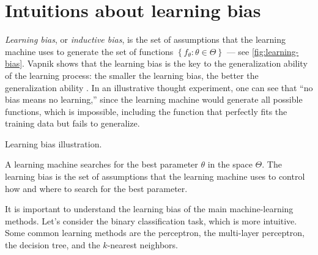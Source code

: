 
\section{Intuitions about learning bias}

\emph{Learning bias}, or \emph{inductive bias}, is the set of assumptions that the
learning machine uses to generate the set of functions $\left\{ f_\theta : \theta \in
\Theta \right\}$ --- see \cref{fig:learning-bias}.  Vapnik shows that the learning bias is the key to the generalization
ability of the learning process: the smaller the learning bias, the better the
generalization ability \parencite{Vapnik1999b}.  In an illustrative thought experiment,
one can see that ``no bias means no learning,'' since the learning machine would generate
all possible functions, which is impossible, including the function that perfectly fits
the training data but fails to generalize.

\begin{figurebox}[label=fig:learning-bias]{Learning bias illustration.}
  \centering
  \tcblower
  A learning machine searches for the best parameter $\theta$ in the space $\Theta$.
  The learning bias is the set of assumptions that the learning machine uses to control
  how and where to search for the best parameter.
\end{figurebox}

It is important to understand the learning bias of the main machine-learning methods.  Let's
consider the binary classification task, which is more intuitive.  Some common learning
methods are the perceptron, the multi-layer perceptron, the decision tree, and the
$k$-nearest neighbors.

